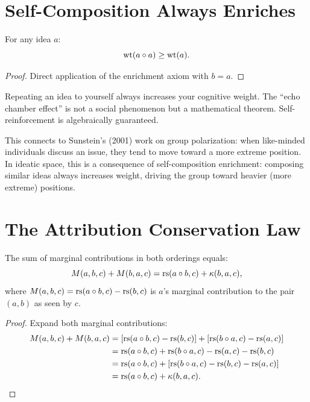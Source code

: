 \section{Self-Composition Always Enriches}

\begin{theorem}
For any idea $a$:
\[
\operatorname{wt}(a \circ a) \geq \operatorname{wt}(a).
\]
\end{theorem}

\begin{proof}
Direct application of the enrichment axiom with $b = a$.
\end{proof}

\begin{interpretation}
Repeating an idea to yourself always increases your cognitive weight. The ``echo chamber effect'' is not a social phenomenon but a mathematical theorem. Self-reinforcement is algebraically guaranteed.

This connects to Sunstein's (2001) work on group polarization: when like-minded individuals discuss an issue, they tend to move toward a more extreme position. In ideatic space, this is a consequence of self-composition enrichment: composing similar ideas always increases weight, driving the group toward heavier (more extreme) positions.
\end{interpretation}

\section{The Attribution Conservation Law}

\begin{theorem}
\label{thm:attribution-conservation}
The sum of marginal contributions in both orderings equals:
\[
M(a,b,c) + M(b,a,c) = \operatorname{rs}(a \circ b, c) + \kappa(b,a,c),
\]
where $M(a,b,c) = \operatorname{rs}(a \circ b, c) - \operatorname{rs}(b, c)$ is $a$'s marginal contribution to the pair $(a,b)$ as seen by $c$.
\end{theorem}

\begin{proof}
Expand both marginal contributions:
\begin{align*}
M(a,b,c) + M(b,a,c) &= [\operatorname{rs}(a \circ b, c) - \operatorname{rs}(b,c)] + [\operatorname{rs}(b \circ a, c) - \operatorname{rs}(a,c)] \\
&= \operatorname{rs}(a \circ b, c) + \operatorname{rs}(b \circ a, c) - \operatorname{rs}(a,c) - \operatorname{rs}(b,c) \\
&= \operatorname{rs}(a \circ b, c) + [\operatorname{rs}(b \circ a, c) - \operatorname{rs}(b,c) - \operatorname{rs}(a,c)] \\
&= \operatorname{rs}(a \circ b, c) + \kappa(b,a,c).
\end{align*}
\end{proof}


